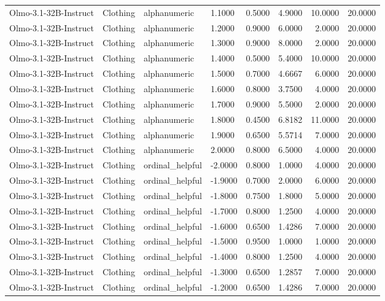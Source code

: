 \begin{table}
\begin{tabular}{llllrrrr}
Olmo-3.1-32B-Instruct & Clothing & alphanumeric & 1.1000 & 0.5000 & 4.9000 & 10.0000 & 20.0000 \\
Olmo-3.1-32B-Instruct & Clothing & alphanumeric & 1.2000 & 0.9000 & 6.0000 & 2.0000 & 20.0000 \\
Olmo-3.1-32B-Instruct & Clothing & alphanumeric & 1.3000 & 0.9000 & 8.0000 & 2.0000 & 20.0000 \\
Olmo-3.1-32B-Instruct & Clothing & alphanumeric & 1.4000 & 0.5000 & 5.4000 & 10.0000 & 20.0000 \\
Olmo-3.1-32B-Instruct & Clothing & alphanumeric & 1.5000 & 0.7000 & 4.6667 & 6.0000 & 20.0000 \\
Olmo-3.1-32B-Instruct & Clothing & alphanumeric & 1.6000 & 0.8000 & 3.7500 & 4.0000 & 20.0000 \\
Olmo-3.1-32B-Instruct & Clothing & alphanumeric & 1.7000 & 0.9000 & 5.5000 & 2.0000 & 20.0000 \\
Olmo-3.1-32B-Instruct & Clothing & alphanumeric & 1.8000 & 0.4500 & 6.8182 & 11.0000 & 20.0000 \\
Olmo-3.1-32B-Instruct & Clothing & alphanumeric & 1.9000 & 0.6500 & 5.5714 & 7.0000 & 20.0000 \\
Olmo-3.1-32B-Instruct & Clothing & alphanumeric & 2.0000 & 0.8000 & 6.5000 & 4.0000 & 20.0000 \\
Olmo-3.1-32B-Instruct & Clothing & ordinal_helpful & -2.0000 & 0.8000 & 1.0000 & 4.0000 & 20.0000 \\
Olmo-3.1-32B-Instruct & Clothing & ordinal_helpful & -1.9000 & 0.7000 & 2.0000 & 6.0000 & 20.0000 \\
Olmo-3.1-32B-Instruct & Clothing & ordinal_helpful & -1.8000 & 0.7500 & 1.8000 & 5.0000 & 20.0000 \\
Olmo-3.1-32B-Instruct & Clothing & ordinal_helpful & -1.7000 & 0.8000 & 1.2500 & 4.0000 & 20.0000 \\
Olmo-3.1-32B-Instruct & Clothing & ordinal_helpful & -1.6000 & 0.6500 & 1.4286 & 7.0000 & 20.0000 \\
Olmo-3.1-32B-Instruct & Clothing & ordinal_helpful & -1.5000 & 0.9500 & 1.0000 & 1.0000 & 20.0000 \\
Olmo-3.1-32B-Instruct & Clothing & ordinal_helpful & -1.4000 & 0.8000 & 1.2500 & 4.0000 & 20.0000 \\
Olmo-3.1-32B-Instruct & Clothing & ordinal_helpful & -1.3000 & 0.6500 & 1.2857 & 7.0000 & 20.0000 \\
Olmo-3.1-32B-Instruct & Clothing & ordinal_helpful & -1.2000 & 0.6500 & 1.4286 & 7.0000 & 20.0000 \\

\end{tabular}
\end{table}
